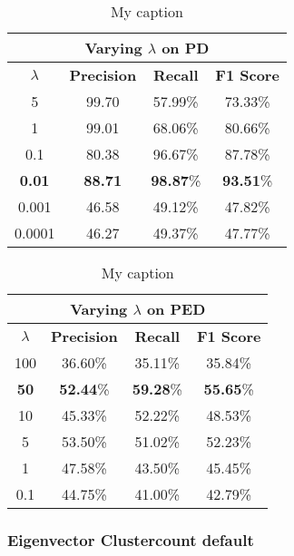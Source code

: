 \begin{table}[H]
\centering
\begin{tabular}{|c|c|c|c|}
\hline
\multicolumn{4}{|c|}{Varying $\lambda$ on PD} \\ \hline
$\lambda$ & \textbf{Precision} & \textbf{Recall} & \textbf{F1 Score} \\ \hline
5 & 99.70 & 57.99\% & 73.33\%  \\ \hline
1 & 99.01 & 68.06\% & 80.66\%  \\ \hline
0.1 & 80.38 & 96.67\% & 87.78\%  \\ \hline
\textbf{0.01} & \textbf{88.71} & \textbf{98.87}\% & \textbf{93.51}\%  \\ \hline
0.001 & 46.58 & 49.12\% & 47.82\%  \\ \hline
0.0001 & 46.27 & 49.37\% & 47.77\%  \\ \hline
\end{tabular}
\caption[Cars Varying $\lambda$]{My caption}
\label{tab:cars_varying_lambas_pd}
\end{table}


\begin{table}[H]
\centering
\begin{tabular}{|c|c|c|c|}
\hline
\multicolumn{4}{|c|}{Varying $\lambda$ on PED}                        \\ \hline
$\lambda$ & \textbf{Precision} & \textbf{Recall} & \textbf{F1 Score} \\ \hline
100 & 36.60\% & 35.11\% & 35.84\%  \\ \hline
\textbf{50} & \textbf{52.44}\% & \textbf{59.28}\% & \textbf{55.65}\%  \\ \hline
10 & 45.33\% & 52.22\% & 48.53\%  \\ \hline
5 & 53.50\% & 51.02\% & 52.23\%  \\ \hline
1 & 47.58\% & 43.50\% & 45.45\%  \\ \hline
0.1 & 44.75\% & 41.00\% & 42.79\%  \\ \hline
\end{tabular}
\caption[Cars Varying $\lambda$]{My caption}
\label{tab:cars_varying_lambas_ped}
\end{table}






\subsubsection{Eigenvector Clustercount default}


